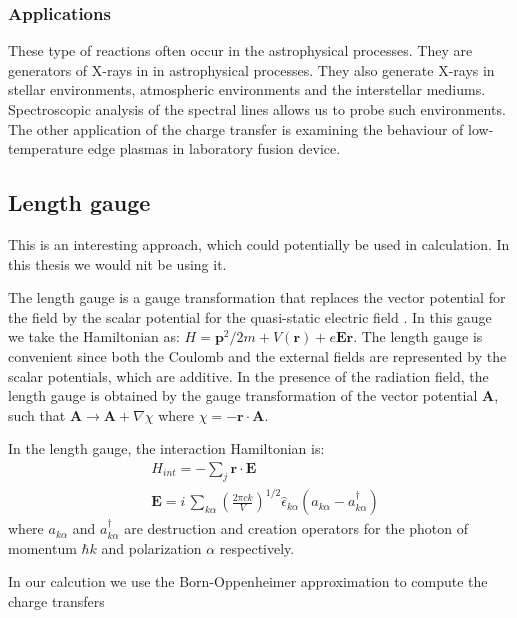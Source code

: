 \subsubsection{Applications}

These type of reactions often occur in the astrophysical processes. They are generators of X-rays in in astrophysical processes. They also generate X-rays in stellar environments, atmospheric environments and the interstellar mediums. Spectroscopic analysis of the spectral lines allows us to probe such environments. \\
The other application of the charge transfer is examining the behaviour of low-temperature edge plasmas in laboratory fusion device.


\subsection*{Length gauge}

This is an interesting approach, which could potentially be used in calculation. In this thesis we would nit be using it.

The length gauge is a gauge transformation that replaces the vector potential for the field by the scalar potential for the quasi-static electric field \cite{LengthGauge3}.  In this gauge we take the Hamiltonian as: $ H = \mathbf{p}^2/2m + V(\mathbf{r})  + e\mathbf{E}\mathbf{r} $. The length gauge is convenient since both the Coulomb and the external fields are represented by the scalar potentials, which are additive. In the presence of the radiation field, the length gauge is obtained by the gauge transformation of the vector potential $ \mathbf{A} $, such that $ \mathbf{A} \rightarrow \mathbf{A} + \nabla \chi $ where $ \chi = - \mathbf{r} \cdot \mathbf{A} $. 

In the length gauge, the interaction Hamiltonian is:
\begin{equation}
\begin{split}
& H_{int} = -\sum_j{ \mathbf{r}\cdot\mathbf{E} } \\[.8em]
& \mathbf{E} = i\,\sum_{k\alpha}{\left(\frac{2\pi c k}{V}\right)^{1/2}\hat{\epsilon}_{k\alpha}\left(a_{k\alpha} - a^{\dagger}_{k\alpha}\right)}
\end{split}
\end{equation}
where $ a_{k\alpha} $ and $ a^{\dagger}_{k\alpha} $ are destruction and creation operators for the photon of momentum $ \hbar k $ and polarization $ \alpha $ respectively.


In our calcution we use the Born-Oppenheimer approximation to compute the charge transfers

